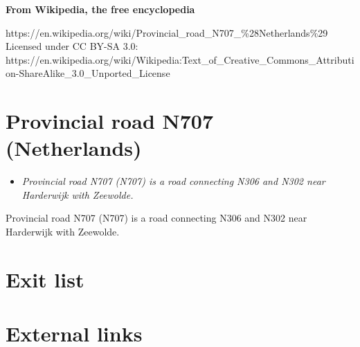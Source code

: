 \textbf{From Wikipedia, the free encyclopedia}

https://en.wikipedia.org/wiki/Provincial\_road\_N707\_\%28Netherlands\%29\\
Licensed under CC BY-SA 3.0:\\
https://en.wikipedia.org/wiki/Wikipedia:Text\_of\_Creative\_Commons\_Attribution-ShareAlike\_3.0\_Unported\_License

\section{Provincial road N707
(Netherlands)}\label{provincial-road-n707-netherlands}

\begin{itemize}
\item
  \emph{Provincial road N707 (N707) is a road connecting N306 and N302
  near Harderwijk with Zeewolde.}
\end{itemize}

Provincial road N707 (N707) is a road connecting N306 and N302 near
Harderwijk with Zeewolde.

\section{Exit list}\label{exit-list}

\section{External links}\label{external-links}
